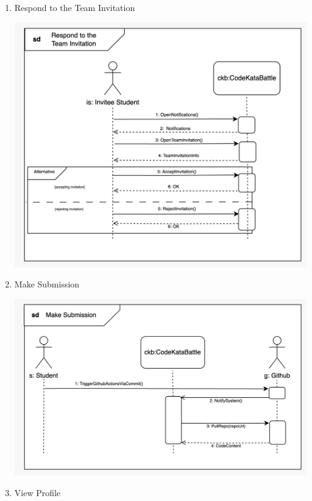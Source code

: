 \begin{enumerate}
\begin{center}
    \end{center}
    \item Respond to the Team Invitation
    \begin{center}
            \includegraphics[scale=0.2]{Images/sequence_diagrams/SD-respond_to_team_invitation.jpeg}
    \end{center}
    \newpage
    \item Make Submission
    \begin{center}
            \includegraphics[scale=0.2]{Images/sequence_diagrams/SD-make_submission.jpeg}
    \end{center}
    \item View Profile
    \begin{center}

\end{center}
\end{enumerate}
